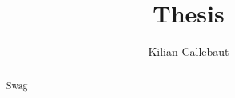 \documentclass[12pt]{report}
\title{Thesis}
\author{Kilian Callebaut}
\begin{document}
	\maketitle
	
	
	\begin{abstract}
		Swag
	\end{abstract}

	\tableofcontents
	

	
	
%	
	
	
		
	
	
	
	
	
 

	
\end{document}
